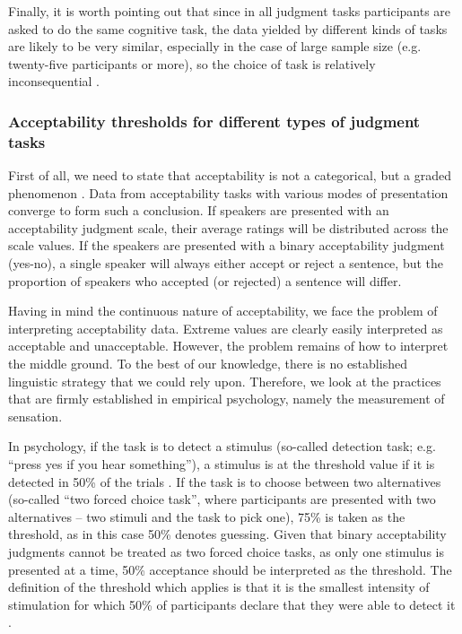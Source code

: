 Finally, it is worth pointing out that since in all judgment tasks participants are asked to do the same cognitive task, the data yielded by different kinds of tasks are likely to be very similar, especially in the case of large sample size (e.g. twenty-five participants or more), so the choice of task is relatively inconsequential \citep[cf.][36]{SchutzeSprouse13}.

\subsubsection{Acceptability thresholds for different types of judgment tasks}
\label{Acceptability thresholds for different types of judgment tasks}
First of all, we need to state that acceptability is not a categorical, but a graded phenomenon \citep{LCL17}. Data from acceptability tasks with various modes of presentation converge to form such a conclusion. If speakers are presented with an acceptability judgment scale, their average ratings will be distributed across the scale values. If the speakers are presented with a binary acceptability judgment (yes-no), a single speaker will always either accept or reject a sentence, but the proportion of speakers who accepted (or rejected) a sentence will differ. 

Having in mind the continuous nature of acceptability, we face the problem of interpreting acceptability data. Extreme values are clearly easily interpreted as acceptable and unacceptable. However, the problem remains of how to interpret the middle ground. To the best of our knowledge, there is no established linguistic strategy that we could rely upon. Therefore, we look at the practices that are firmly established in empirical psychology, namely the measurement of sensation.

In psychology, if the task is to detect a stimulus (so-called detection task; e.g. “press yes if you hear something”), a stimulus is at the threshold value if it is detected in 50\% of the trials \citep{Weber34, Fechner60, Smith08, JWH09, Goldstein10}. If the task is to choose between two alternatives (so-called “two forced choice task”, where participants are presented with two alternatives -- two stimuli and the task to pick one), 75\% is taken as the threshold, as in this case 50\% denotes guessing. Given that binary acceptability judgments cannot be treated as two forced choice tasks, as only one stimulus is presented at a time, 50\% acceptance should be interpreted as the threshold. The definition of the threshold which applies is that it is the smallest intensity of stimulation for which 50\% of participants declare that they were able to detect it \citep{Smith08, Goldstein10}.

